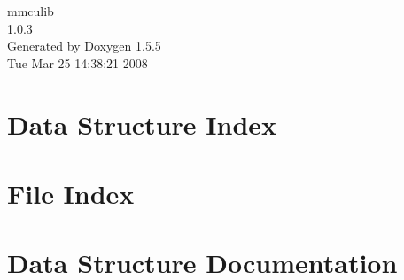 \documentclass[a4paper]{book}
\begin{document}
\begin{titlepage}
\vspace*{7cm}
\begin{center}
{\Large mmculib \\[1ex]\large 1.0.3 }\\
\vspace*{1cm}
{\large Generated by Doxygen 1.5.5}\\
\vspace*{0.5cm}
{\small Tue Mar 25 14:38:21 2008}\\
\end{center}
\end{titlepage}
\clearemptydoublepage
{}
\tableofcontents
\clearemptydoublepage
{}
\chapter{Data Structure Index}

\chapter{File Index}

\chapter{Data Structure Documentation}






























\end{document}
